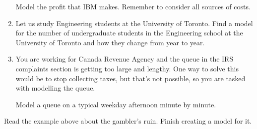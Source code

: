 \begin{exercises}
\begin{problist}
\begin{enumerate}
			Model the profit that IBM makes. Remember to consider all sources of costs.
	
		\item Let us study Engineering students at the University of Toronto. Find a model for the number of undergraduate students in the Engineering school at the University of Toronto and how they change from year to year. 

		\item You are working for Canada Revenue Agency and the queue in the IRS complaints section is getting too large and lengthy. One way to solve this would be to stop collecting taxes, but that's not possible, so you are tasked with modelling the queue. 

			Model a queue on a typical weekday afternoon minute by minute. 



	\end{enumerate}

	
	
	\prob Read the example above about the gambler's ruin. Finish creating a model for it.
	
	
	\end{problist}
\end{exercises}
